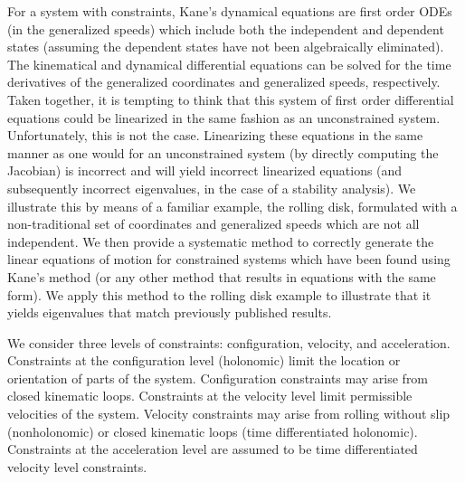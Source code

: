 \documentclass[smallcondensed,final]{svjour3}                     %
\begin{document}
For a system with constraints, Kane's dynamical equations\cite{Kane1985} are
first order ODEs (in the generalized speeds) which include both the
independent and dependent states (assuming the dependent states have not been
algebraically eliminated). The kinematical and dynamical differential equations
can be solved for the time derivatives of the generalized coordinates and
generalized speeds, respectively. Taken together, it is tempting to think that
this system of first order differential equations could be linearized in the
same fashion as an unconstrained system.  Unfortunately, this is not the case.
Linearizing these equations in the same manner as one would for an
unconstrained system (by directly computing the Jacobian) is incorrect and will
yield incorrect linearized equations (and subsequently incorrect eigenvalues,
in the case of a stability analysis). We illustrate this by means of a familiar
example, the rolling disk, formulated with a non-traditional set of coordinates
and generalized speeds which are not all independent. We then provide a
systematic method to correctly generate the linear equations of motion for
constrained systems which have been found using Kane's method (or any other
method that results in equations with the same form). We apply this method to
the rolling disk example to illustrate that it yields eigenvalues that match
previously published results.

We consider three levels of constraints: configuration, velocity, and
acceleration. Constraints at the configuration level (holonomic) limit the
location or orientation of parts of the system. Configuration constraints may
arise from closed kinematic loops. Constraints at the velocity level limit
permissible velocities of the system. Velocity constraints may arise from
rolling without slip (nonholonomic) or closed kinematic loops (time
differentiated holonomic).  Constraints at the acceleration level are assumed
to be time differentiated velocity level constraints.
\end{document}
